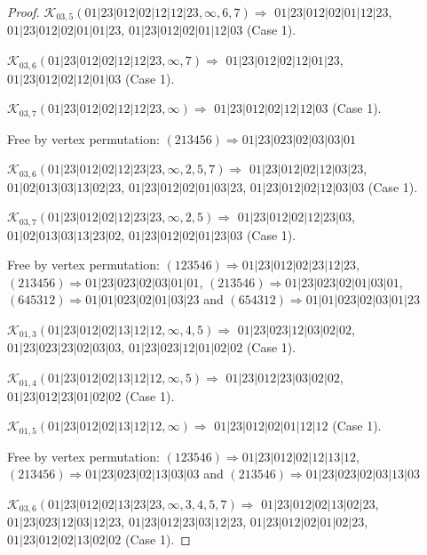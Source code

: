 \documentclass[12pt]{article}
\theoremstyle{plain}
\theoremstyle{definition}
\theoremstyle{remark}
\newcommand{\fancy}[1]{\mathcal{#1}}
\def\K{\fancy{K}}
\begin{document}
\begin{proof}
	
	
	\bigskip
	
	$\K_{03,5}(01|23|012|02|12|12|23,\infty,6, 7)\Rightarrow $ $01|23|012|02|01|12|23$, $01|23|012|02|01|01|23$, $01|23|012|02|01|12|03$ (Case 1).
	
	$\K_{03,6}(01|23|012|02|12|12|23,\infty,7)\Rightarrow $ $01|23|012|02|12|01|23$, $01|23|012|02|12|01|03$ (Case 1).
	
	$\K_{03,7}(01|23|012|02|12|12|23,\infty)\Rightarrow $ $01|23|012|02|12|12|03$ (Case 1).
	
	
	
	Free by vertex permutation: $(2 1 3 4 5 6)\Rightarrow 01|23|023|02|03|03|01$
	
	
	
	\bigskip
	
	$\K_{03,6}(01|23|012|02|12|23|23,\infty,2, 5, 7)\Rightarrow $ $01|23|012|02|12|03|23$, $01|02|013|03|13|02|23$, $01|23|012|02|01|03|23$, $01|23|012|02|12|03|03$ (Case 1).
	
	$\K_{03,7}(01|23|012|02|12|23|23,\infty,2, 5)\Rightarrow $ $01|23|012|02|12|23|03$, $01|02|013|03|13|23|02$, $01|23|012|02|01|23|03$ (Case 1).
	
	
	
	Free by vertex permutation: $(1 2 3 5 4 6)\Rightarrow 01|23|012|02|23|12|23$, $(2 1 3 4 5 6)\Rightarrow 01|23|023|02|03|01|01$, $(2 1 3 5 4 6)\Rightarrow 01|23|023|02|01|03|01$, $(6 4 5 3 1 2)\Rightarrow 01|01|023|02|01|03|23$ and $(6 5 4 3 1 2)\Rightarrow 01|01|023|02|03|01|23$
	
	
	
	\bigskip
	
	$\K_{01,3}(01|23|012|02|13|12|12,\infty,4, 5)\Rightarrow $ $01|23|023|12|03|02|02$, $01|23|023|23|02|03|03$, $01|23|023|12|01|02|02$ (Case 1).
	
	$\K_{01,4}(01|23|012|02|13|12|12,\infty,5)\Rightarrow $ $01|23|012|23|03|02|02$, $01|23|012|23|01|02|02$ (Case 1).
	
	$\K_{01,5}(01|23|012|02|13|12|12,\infty)\Rightarrow $ $01|23|012|02|01|12|12$ (Case 1).
	
	
	
	Free by vertex permutation: $(1 2 3 5 4 6)\Rightarrow 01|23|012|02|12|13|12$, $(2 1 3 4 5 6)\Rightarrow 01|23|023|02|13|03|03$ and $(2 1 3 5 4 6)\Rightarrow 01|23|023|02|03|13|03$
	
	
	
	\bigskip
	
	$\K_{03,6}(01|23|012|02|13|23|23,\infty,3, 4, 5, 7)\Rightarrow $ $01|23|012|02|13|02|23$, $01|23|023|12|03|12|23$, $01|23|012|23|03|12|23$, $01|23|012|02|01|02|23$, $01|23|012|02|13|02|02$ (Case 1).
	

\end{proof}
\end{document}
